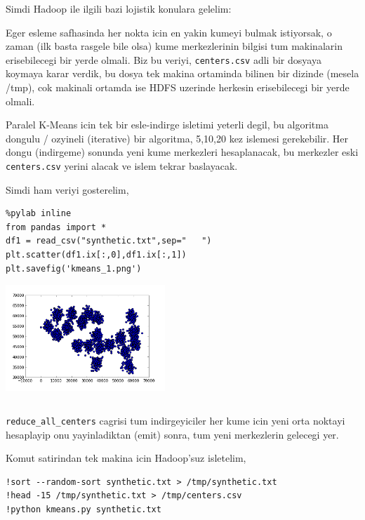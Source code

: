 \documentclass[12pt,fleqn]{article}\usepackage{../common}
\begin{document}
Simdi Hadoop ile ilgili bazi lojistik konulara gelelim:

Eger esleme safhasinda her nokta icin en yakin kumeyi bulmak
istiyorsak, o zaman (ilk basta rasgele bile olsa) kume merkezlerinin
bilgisi tum makinalarin erisebilecegi bir yerde olmali. Biz bu veriyi,
\verb!centers.csv! adli bir dosyaya koymaya karar verdik, bu dosya
tek makina ortaminda bilinen bir dizinde (mesela /tmp), cok makinali ortamda
ise HDFS uzerinde herkesin erisebilecegi bir yerde olmali. 

Paralel K-Means icin tek bir esle-indirge isletimi yeterli degil, bu
algoritma dongulu / ozyineli (iterative) bir algoritma, 5,10,20 kez
islemesi gerekebilir.  Her dongu (indirgeme) sonunda yeni kume
merkezleri hesaplanacak, bu merkezler eski \verb!centers.csv!
yerini alacak ve islem tekrar baslayacak.

Simdi ham veriyi gosterelim,

\begin{verbatim}
%pylab inline
from pandas import *
df1 = read_csv("synthetic.txt",sep="   ")
plt.scatter(df1.ix[:,0],df1.ix[:,1])
plt.savefig('kmeans_1.png')
\end{verbatim}

\includegraphics[height=4cm]{kmeans_1.png}

\inputminted{python}{kmeans.py}

\verb!reduce_all_centers! cagrisi tum indirgeyiciler her kume icin yeni
orta noktayi hesaplayip onu yayinladiktan (emit) sonra, tum yeni
merkezlerin gelecegi yer.

Komut satirindan tek makina icin Hadoop'suz isletelim,

\begin{verbatim}
!sort --random-sort synthetic.txt > /tmp/synthetic.txt
!head -15 /tmp/synthetic.txt > /tmp/centers.csv
!python kmeans.py synthetic.txt
\end{verbatim}
\end{document}
